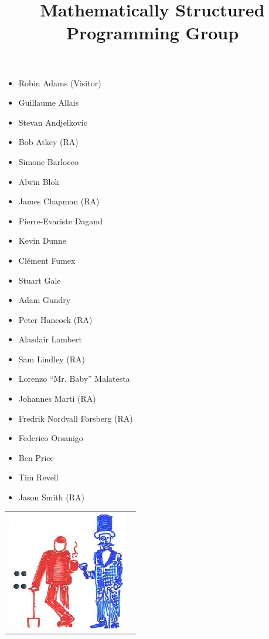 \documentclass{article}
\begin{document}
\title{\Huge \textbf{Mathematically Structured Programming Group}}

\date{}
\maketitle
\thispagestyle{empty} %

\begin{center}

\begin{multicols}{2}
\large
\begin{itemize}
  \item Robin Adams (Visitor)
  \item Guillaume Allais
  \item Stevan Andjelkovic
  \item Bob Atkey (RA)
  \item Simone Barlocco
  \item Alwin Blok
  \item James Chapman (RA)
  \item Pierre-Evariste Dagand
  \item Kevin Dunne
  \item Cl\'{e}ment Fumex
  \item Stuart Gale
  \item Adam Gundry
  \item Peter Hancock (RA)
  \item Alasdair Lambert
  \item Sam Lindley (RA)
  \item Lorenzo ``Mr. Baby'' Malatesta
  \item Johannes Marti (RA)
  \item Fredrik Nordvall Forsberg (RA)
  \item Federico Orsanigo
  \item Ben Price
  \item Tim Revell
  \item Jason Smith (RA)
\end{itemize}
\end{multicols}
\vskip 3cm
\end{center}

\begin{tabular}{l r}
\hskip 1cm
\includegraphics[scale=0.65]{semicolon.png} &
\end{tabular}
\end{document}
